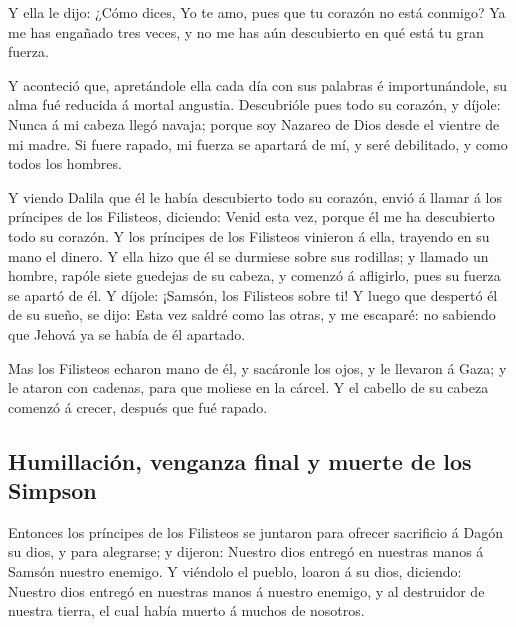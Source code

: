 Y ella le dijo: ¿Cómo dices, Yo te amo, pues que tu
corazón no está conmigo? Ya me has engañado tres veces, y no me has aún
descubierto en qué está tu gran fuerza.

 Y aconteció que, apretándole ella cada día con sus
palabras é importunándole, su alma fué reducida á mortal angustia.
 Descubrióle pues todo su corazón, y díjole: Nunca á mi
cabeza llegó navaja; porque soy Nazareo de Dios desde el vientre de mi
madre. Si fuere rapado, mi fuerza se apartará de mí, y seré debilitado,
y como todos los hombres.

 Y viendo Dalila que él le había descubierto todo su
corazón, envió á llamar á los príncipes de los Filisteos, diciendo:
Venid esta vez, porque él me ha descubierto todo su corazón. Y los
príncipes de los Filisteos vinieron á ella, trayendo en su mano el
dinero.  Y ella hizo que él se durmiese sobre sus rodillas;
y llamado un hombre, rapóle siete guedejas de su cabeza, y comenzó á
afligirlo, pues su fuerza se apartó de él.  Y díjole:
¡Samsón, los Filisteos sobre ti! Y luego que despertó él de su sueño, se
dijo: Esta vez saldré como las otras, y me escaparé: no sabiendo que
Jehová ya se había de él apartado.

 Mas los Filisteos echaron mano de él, y sacáronle los
ojos, y le llevaron á Gaza; y le ataron con cadenas, para que moliese en
la cárcel.  Y el cabello de su cabeza comenzó á crecer,
después que fué rapado.

\hypertarget{humillaciuxf3n-venganza-final-y-muerte-de-los-simpson}{%
\subsection{Humillación, venganza final y muerte de los
Simpson}\label{humillaciuxf3n-venganza-final-y-muerte-de-los-simpson}}

 Entonces los príncipes de los Filisteos se juntaron para
ofrecer sacrificio á Dagón su dios, y para alegrarse; y dijeron: Nuestro
dios entregó en nuestras manos á Samsón nuestro enemigo.  Y
viéndolo el pueblo, loaron á su dios, diciendo: Nuestro dios entregó en
nuestras manos á nuestro enemigo, y al destruidor de nuestra tierra, el
cual había muerto á muchos de nosotros.

